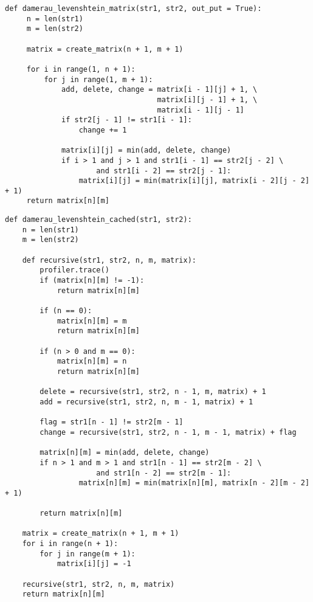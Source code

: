 \begin{lstlisting}[label=lst:dlev_matrix,caption=Функция нахождения расстояния Дамерау Левенштейна с использованием кеша.]
def damerau_levenshtein_matrix(str1, str2, out_put = True):
     n = len(str1)
     m = len(str2)

     matrix = create_matrix(n + 1, m + 1)
     
     for i in range(1, n + 1):
         for j in range(1, m + 1):
             add, delete, change = matrix[i - 1][j] + 1, \
                                   matrix[i][j - 1] + 1, \
                                   matrix[i - 1][j - 1]
             if str2[j - 1] != str1[i - 1]:
                 change += 1

             matrix[i][j] = min(add, delete, change)
             if i > 1 and j > 1 and str1[i - 1] == str2[j - 2] \
                     and str1[i - 2] == str2[j - 1]:
                 matrix[i][j] = min(matrix[i][j], matrix[i - 2][j - 2] + 1)
     return matrix[n][m]
\end{lstlisting}

\begin{lstlisting}[label=lst:dlev_matrix_rec,caption=Функция нахождения расстояния Дамерау Левенштейна с использованием кеша и рекурсии.]
def damerau_levenshtein_cached(str1, str2):
    n = len(str1)
    m = len(str2)

    def recursive(str1, str2, n, m, matrix):
        profiler.trace()
        if (matrix[n][m] != -1):
            return matrix[n][m]

        if (n == 0):
            matrix[n][m] = m
            return matrix[n][m]

        if (n > 0 and m == 0):
            matrix[n][m] = n
            return matrix[n][m]

        delete = recursive(str1, str2, n - 1, m, matrix) + 1
        add = recursive(str1, str2, n, m - 1, matrix) + 1

        flag = str1[n - 1] != str2[m - 1]
        change = recursive(str1, str2, n - 1, m - 1, matrix) + flag

        matrix[n][m] = min(add, delete, change)
        if n > 1 and m > 1 and str1[n - 1] == str2[m - 2] \
                     and str1[n - 2] == str2[m - 1]:
                 matrix[n][m] = min(matrix[n][m], matrix[n - 2][m - 2] + 1)

        return matrix[n][m]

    matrix = create_matrix(n + 1, m + 1)
    for i in range(n + 1):
        for j in range(m + 1):
            matrix[i][j] = -1

    recursive(str1, str2, n, m, matrix)
    return matrix[n][m]

\end{lstlisting}


